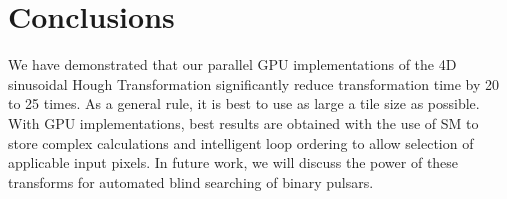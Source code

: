 \section{Conclusions}
\label{Conclusion}

We have demonstrated that our parallel GPU implementations of the 4D sinusoidal Hough Transformation significantly reduce transformation time by 20 to 25 times. As a general rule, it is best to use as large a tile size as possible. With GPU implementations, best results are obtained with the use of SM to store complex calculations and intelligent loop ordering to allow selection of applicable input pixels. In future work, we will discuss the power of these transforms for automated blind searching of binary pulsars.  


